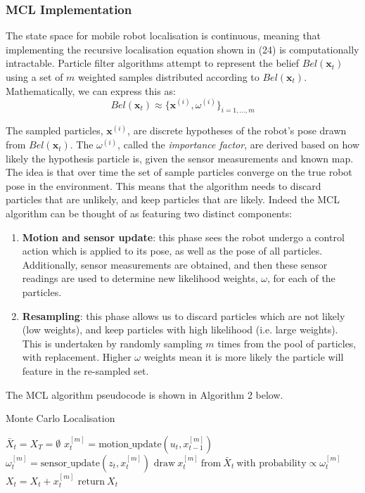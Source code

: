 \documentclass[a4paper]{article}
\begin{document}
\subsubsection{MCL Implementation}
The state space for mobile robot localisation is continuous, meaning that implementing the recursive localisation equation shown in (24) is computationally intractable. Particle filter algorithms attempt to represent the belief $Bel(\mathbf{x}_t)$ using a set of $m$ weighted samples distributed according to $Bel(\mathbf{x}_t)$. Mathematically, we can express this as:
\begin{equation}
Bel(\mathbf{x}_t) \approx \{\mathbf{x}^{(i)}, \omega^{(i)} \}_{i=1,...,m}
\end{equation}

The sampled particles, $\mathbf{x}^{(i)}$, are discrete hypotheses of the robot's pose drawn from $Bel(\mathbf{x}_t)$. The $\omega^{(i)}$, called the \textit{importance factor}, are derived based on how likely the hypothesis particle is, given the sensor measurements and known map. The idea is that over time the set of sample particles converge on the true robot pose in the environment. This means that the algorithm needs to discard particles that are unlikely, and keep particles that are likely. Indeed the MCL algorithm can be thought of as featuring two distinct components:
\begin{enumerate}
\item \textbf{Motion and sensor update}: this phase sees the robot undergo a control action which is applied to its pose, as well as the pose of all particles. Additionally, sensor measurements are obtained, and then these sensor readings are used to determine new likelihood weights, $\omega$, for each of the particles.
\item \textbf{Resampling}: this phase allows us to discard particles which are not likely (low weights), and keep particles with high likelihood (i.e. large weights). This is undertaken by randomly sampling $m$ times from the pool of particles, with replacement. Higher $\omega$ weights mean it is more likely the particle will feature in the re-sampled set.
\end{enumerate}

The MCL algorithm pseudocode is shown in Algorithm 2 below.
\begin{algorithm}
\caption{Monte Carlo Localisation}
\begin{algorithmic}[1]
\State $\bar{X}_t = X_T = \emptyset$
	\State $x^{[m]}_t = \text{motion\_update}(u_t, x^{[m]}_{t-1})$
	\State $\omega^{[m]}_t = \text{sensor\_update}(z_t, x^{[m]}_t)$
\EndFor
{}
	\State $\text{draw} \ x^{[m]}_t \ \text{from} \  \bar{X}_t \ \text{with probability} \propto \omega^{[m]}_t$
	\State $X_t = X_t + x^{[m]}_t$
\EndFor
\State $\text{return} \ X_t$
\EndProcedure
\end{algorithmic}
\end{algorithm}
\end{document}

